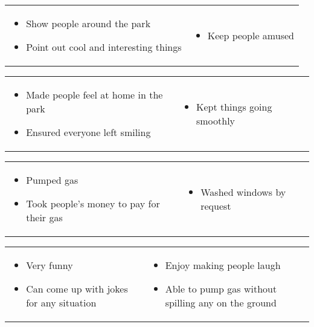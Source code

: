 \documentclass[letterpaper,10pt]{resume}
\begin{document}
	\begin{body}
		\begin{tabular}{p{} p{}}
			\begin{itemize}
			\item Show people around the park
			\item Point out cool and interesting things
			\end{itemize}
		&
			\begin{itemize}
			\item Keep people amused
			\end{itemize}
		\end{tabular}
		\begin{tabular}{p{} p{}}
			\begin{itemize}
			\item Made people feel at home in the park
			\item Ensured everyone left smiling
			\end{itemize}
		&
			\begin{itemize}
			\item Kept things going smoothly
			\end{itemize}
		\end{tabular}

		\begin{tabular}{p{} p{}}
			\begin{itemize}
			\item Pumped gas
			\item Took people's money to pay for their gas
			\end{itemize}
		&
			\begin{itemize}
			\item Washed windows by request
			\end{itemize}
		\end{tabular}
	\end{body}

	\begin{body}
		\begin{tabular}{p{} p{0.5\textwidth}}
		\begin{itemize}
		\item Very funny
		\item Can come up with jokes for any situation
		\end{itemize}
		&
		\begin{itemize}
		\item Enjoy making people laugh
		\item Able to pump gas without spilling any on the ground
		\end{itemize}
		\end{tabular}
	\end{body}
\end{document}
